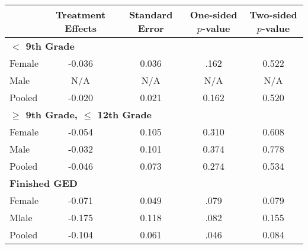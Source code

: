  \begin{tabular}{lcccc} \hline \hline
 & Treatment Effects  & Standard Error  & One-sided $p$-value  & Two-sided $p$-value  \\  \hline  
  \multicolumn{5}{l}{\textbf{$<$ 9th Grade}}\\
Female &    -0.036 &     0.036 &     .162 &     0.522 \\  
Male &     N/A &     N/A &     N/A &     N/A \\  
Pooled &    -0.020 &     0.021 &     0.162 &     0.520 \\  
  \multicolumn{5}{l}{\textbf{$\geq$ 9th Grade, $\leq$ 12th Grade}}\\
Female &    -0.054 &     0.105 &     0.310 &     0.608 \\  
Male &    -0.032 &     0.101 &     0.374 &     0.778 \\  
Pooled &    -0.046 &     0.073 &     0.274 &     0.534 \\  
  \multicolumn{5}{l}{\textbf{Finished GED}}\\
 Female &    -0.071 &     0.049 &     .079 &     0.079 \\  
Mlale &    -0.175 &     0.118 &     .082 &     0.155 \\  
Pooled &    -0.104 &     0.061 &     .046 &     0.084 \\  
\hline \hline \end{tabular}
